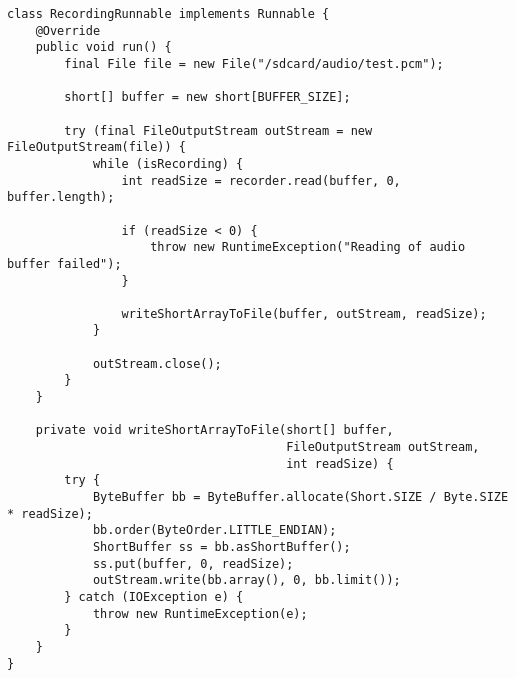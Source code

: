 \begin{verbatim}
class RecordingRunnable implements Runnable {
    @Override
    public void run() {
        final File file = new File("/sdcard/audio/test.pcm");

        short[] buffer = new short[BUFFER_SIZE];

        try (final FileOutputStream outStream = new FileOutputStream(file)) {
            while (isRecording) {
                int readSize = recorder.read(buffer, 0, buffer.length);

                if (readSize < 0) {
                    throw new RuntimeException("Reading of audio buffer failed");
                }

                writeShortArrayToFile(buffer, outStream, readSize);
            }

            outStream.close();
        }
    }
    
    private void writeShortArrayToFile(short[] buffer,
                                       FileOutputStream outStream,
                                       int readSize) {
        try {
            ByteBuffer bb = ByteBuffer.allocate(Short.SIZE / Byte.SIZE * readSize);
            bb.order(ByteOrder.LITTLE_ENDIAN);
            ShortBuffer ss = bb.asShortBuffer();
            ss.put(buffer, 0, readSize);
            outStream.write(bb.array(), 0, bb.limit());
        } catch (IOException e) {
            throw new RuntimeException(e);
        }
    }
}
\end{verbatim}

